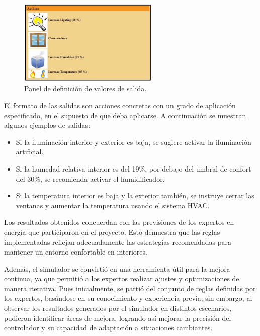 \begin{enumerate}
	\begin{figure}[H]
		\centering
		\includegraphics[width=0.6\textwidth]{imgs/simulator-actions-output.JPG}
		\caption{Panel de definición de valores de salida.}
		\label{fig:simulator-actions-output}
	\end{figure}
	
	El formato de las salidas son acciones concretas con un grado de aplicación especificado, en el supuesto de que deba aplicarse. A continuación se muestran algunos ejemplos de salidas:
	
	\begin{itemize}
		\item Si la iluminación interior y exterior es baja, se sugiere activar la iluminación artificial.
		\item Si la humedad relativa interior es del 19\%, por debajo del umbral de confort del 30\%, se recomienda activar el humidificador.
		\item Si la temperatura interior es baja y la exterior también, se instruye cerrar las ventanas y aumentar la temperatura usando el sistema HVAC.
	\end{itemize}
	
\end{enumerate}

Los resultados obtenidos concuerdan con las previsiones de los expertos en energía que participaron en el proyecto. Esto demuestra que las reglas implementadas reflejan adecuadamente las estrategias recomendadas para mantener un entorno confortable en interiores. 

Además, el simulador se convirtió en una herramienta útil para la mejora continua, ya que permitió a los expertos realizar ajustes y optimizaciones de manera iterativa. Pues inicialmente, se partió del conjunto de reglas definidas por los expertos, basándose en su conocimiento y experiencia previa; sin embargo, al observar los resultados generados por el simulador en distintos escenarios, pudieron identificar áreas de mejora, logrando así mejorar la precisión del controlador y su capacidad de adaptación a situaciones cambiantes. 

